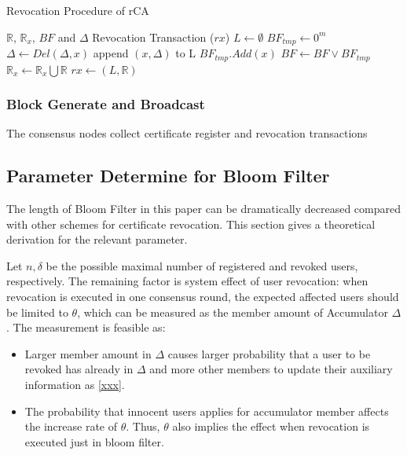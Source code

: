 \documentclass[conference]{IEEEtran}
\begin{document}
\begin{algorithm}
\renewcommand{\algorithmicensure}{\textbf{Output:}}
	\caption{Revocation Procedure of rCA}\label{alg:cap}
	\begin{algorithmic}[1]
		\Require $\mathbb{R}$, $\mathbb{R}_x$, $BF$ and $\Delta$ %
		\Ensure Revocation Transaction ($rx$)
		\State $L\gets \emptyset$
		\State $BF_{tmp} \gets 0^m$ 
		\State $\Delta \gets Del(\Delta, x)$ 
		\State append $(x, \Delta)$ to L
		\Else
		\State $BF_{tmp}.Add(x)$
		\EndIf
		\EndFor
		\State $BF \gets BF \lor BF_{tmp}$
		\State $\mathbb{R}_x \gets \mathbb{R}_x \bigcup \mathbb{R} $
		\State $rx \gets (L, \mathbb{R})$
	\end{algorithmic}
\end{algorithm}

\subsubsection{Block Generate and Broadcast}
The consensus nodes collect certificate register and revocation transactions 
\subsection{Parameter Determine for Bloom Filter} \label{section:parameter}

The length of Bloom Filter in this paper can be dramatically decreased compared with other schemes for certificate revocation. This section gives a theoretical derivation for the relevant parameter.

Let $n, \delta$ be the possible maximal number of registered and revoked users, respectively. The remaining factor is system effect of user revocation: when revocation is executed in one consensus round, the expected affected users should be limited to $\theta$, which can be measured as the member amount of Accumulator $\Delta$. The measurement is feasible as:
\begin{itemize}
    \item Larger member amount in $\Delta$ causes larger probability that a user to be revoked has already in $\Delta$ and more other members to update their auxiliary information as \eqref{xxx}.
    \item The probability that innocent users applies for accumulator member affects the increase rate of $\theta$. Thus, $\theta$ also implies the effect when revocation is executed just in bloom filter.
\end{itemize}
\end{document}
